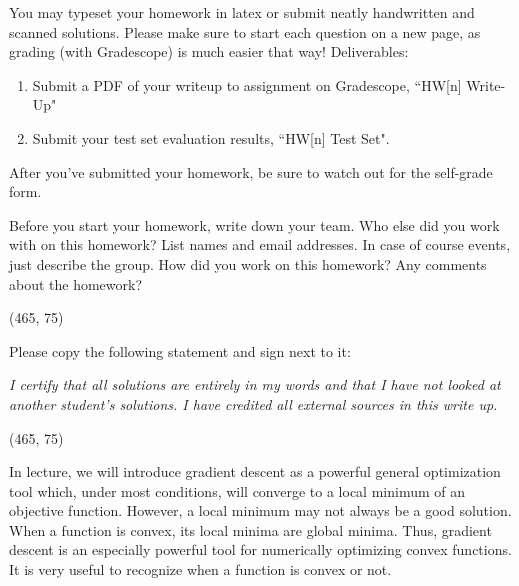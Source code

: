 
You may typeset your homework in latex or submit neatly handwritten and scanned solutions. Please make sure to start each question on a new page, as grading (with Gradescope) is much easier that way! Deliverables:

\begin{enumerate}
  \item Submit a PDF of your writeup to assignment on Gradescope, ``HW[n] Write-Up"
  \item Submit your test set evaluation results, ``HW[n] Test Set".
\end{enumerate}

After you've submitted your homework, be sure to watch out for the self-grade form.

\begin{Parts}

\Part Before you start your homework, write down your team. Who else did you work with on this homework? List names and email addresses. In case of course events, just describe the group. How did you work on this homework? Any comments about the homework?

\vspace{15pt}
\framebox(465, 75){}

\Part Please copy the following statement and sign next to it:

\textit{I certify that all solutions are entirely in my words and that I have not looked at another student's solutions. I have credited all external sources in this write up.}

\vspace{15pt}
\framebox(465, 75){}

\end{Parts}

\pagebreak
{}


In lecture, we will introduce gradient descent as a powerful general optimization tool which, under most conditions, will converge to a local minimum of an objective function. However, a local minimum may not always be a good solution. When a function is convex, its local minima are global minima. Thus, gradient descent is an especially powerful tool for numerically optimizing convex functions. It is very useful to recognize when a function is convex or not.

